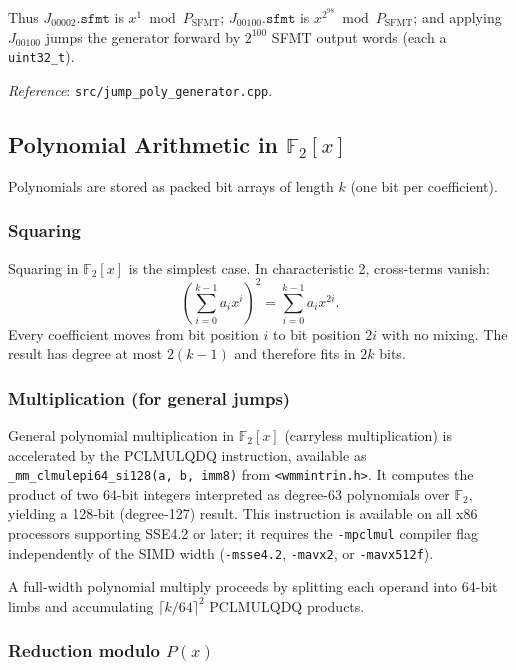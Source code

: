 \documentclass{article}
\begin{document}
Thus $J_{00002}.\texttt{sfmt}$ is $x^1 \bmod P_\text{SFMT}$; $J_{00100}.\texttt{sfmt}$ is
$x^{2^{98}} \bmod P_\text{SFMT}$; and applying $J_{00100}$ jumps the generator forward by
$2^{100}$ SFMT output words (each a \texttt{uint32\_t}).

\noindent\textit{Reference}: \texttt{src/jump\_poly\_generator.cpp}.

\subsection{Polynomial Arithmetic in $\mathbb{F}_2[x]$}
\label{sec:polyarith}

Polynomials are stored as packed bit arrays of length $k$ (one bit per coefficient).

\subsubsection{Squaring}

Squaring in $\mathbb{F}_2[x]$ is the simplest case.  In characteristic 2, cross-terms
vanish:
\begin{equation}
  \left(\sum_{i=0}^{k-1} a_i x^i\right)^2 = \sum_{i=0}^{k-1} a_i x^{2i}.
\end{equation}
Every coefficient moves from bit position $i$ to bit position $2i$ with no mixing.  The
result has degree at most $2(k-1)$ and therefore fits in $2k$ bits.

\subsubsection{Multiplication (for general jumps)}

General polynomial multiplication in $\mathbb{F}_2[x]$ (carryless multiplication) is
accelerated by the PCLMULQDQ instruction, available as
\texttt{\_mm\_clmulepi64\_si128(a, b, imm8)} from \texttt{<wmmintrin.h>}.  It computes the
product of two 64-bit integers interpreted as degree-63 polynomials over $\mathbb{F}_2$,
yielding a 128-bit (degree-127) result.  This instruction is available on all x86 processors
supporting SSE4.2 or later; it requires the \texttt{-mpclmul} compiler flag independently
of the SIMD width (\texttt{-msse4.2}, \texttt{-mavx2}, or \texttt{-mavx512f}).

A full-width polynomial multiply proceeds by splitting each operand into 64-bit limbs and
accumulating $\lceil k/64\rceil^2$ PCLMULQDQ products.

\subsubsection{Reduction modulo $P(x)$}
\end{document}
